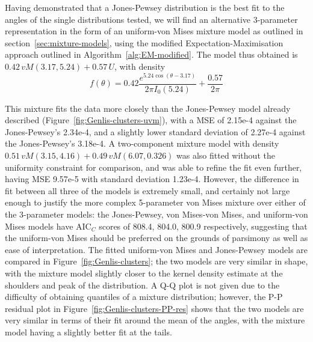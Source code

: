 \documentclass[../../ArchStats.tex]{subfiles}
\begin{document}
Having demonstrated that a Jones-Pewsey distribution is the best fit to the angles of the single distributions tested, we will find an alternative 3-parameter representation in the form of an uniform-von Mises mixture model as outlined in section~\ref{sec:mixture-models}, using the modified Expectation-Maximisation approach  outlined in Algorithm~\ref{alg:EM-modified}. The model thus obtained is $0.42\,vM(3.17, 5.24) + 0.57\,U$, with density 
\begin{equation}
\label{eq:EM-mixture}
f(\theta) = 0.42 \frac{e^{5.24 \cos(\theta - 3.17)}}{2\pi I_0(5.24)} + \frac{0.57}{2\pi}
\end{equation}

This mixture  fits the data  more closely than the Jones-Pewsey model already described (Figure~\ref{fig:Genlis-clusters-uvm}), with a MSE of 2.15e-4 against the Jones-Pewsey's 2.34e-4, and a slightly lower standard deviation of 2.27e-4 against the Jones-Pewsey's 3.18e-4. A two-component mixture model with density $0.51\,vM(3.15, 4.16) + 0.49\, vM(6.07, 0.326)$ was also fitted without the uniformity constraint for comparison, and was able to refine the fit even further, having MSE 9.57e-5 with standard deviation 1.23e-4. However, the difference in fit between all three of the models is extremely small, and certainly not large enough to justify the more complex 5-parameter von Mises mixture over either of the 3-parameter models: the Jones-Pewsey, von Mises-von Mises, and uniform-von Mises models have AIC$_C$ scores of 808.4, 804.0, 800.9 respectively, suggesting that the uniform-von Mises should be preferred on the grounds of parsimony as well as ease of interpretation. The fitted uniform-von Mises and Jones-Pewsey models are  compared in Figure~\ref{fig:Genlis-clusters}; the two models are very similar in shape, with the mixture model slightly closer to the kernel density estimate at the shoulders and peak of the distribution. A Q-Q plot is not given due to the difficulty of obtaining quantiles of a mixture distribution; however, the P-P residual plot in Figure~\ref{fig:Genlis-clusters-PP-res} shows that the two models are very similar in terms of their fit around the mean of the angles, with the mixture model having a slightly better fit at the tails.
\end{document}
